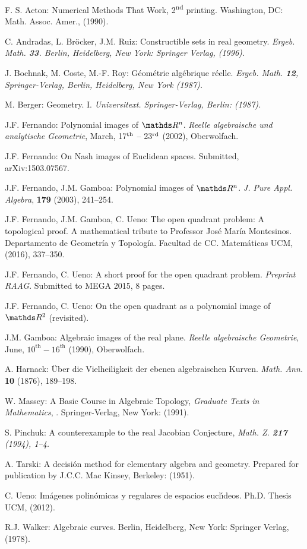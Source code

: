 \documentclass[11pt, a4paper, english, twoside, notitlepage, openright]{report}
\begin{document}
\begin{thebibliography}{ABR}

 F. S. Acton: Numerical Methods That Work, 2\textsuperscript{nd} printing. Washington, DC: Math. Assoc. Amer., (1990). 

 C. Andradas, L. Br\"ocker, J.M. Ruiz: Constructible sets in real geometry. \em Ergeb. Math. \em{\bf 33}. Berlin, Heidelberg, New York: Springer Verlag, (1996).

 J. Bochnak, M. Coste, M.-F. Roy: G\'eom\'etrie alg\'ebrique r\'eelle. \em Ergeb. Math. \em {\bf 12}, Springer-Verlag, Berlin, Heidelberg, New York (1987).

 M. Berger: Geometry. I. \em Universitext\em. Springer-Verlag, Berlin: (1987).

 J.F. Fernando: Polynomial images of $\R^n$. {\em Reelle algebraische und analytische Geometrie}, March, 17$^{\rm th}$ -- 23$^{\rm rd}$ (2002), Oberwolfach.

 J.F. Fernando: On Nash images of Euclidean spaces. Submitted, arXiv:1503.07567.

 J.F. Fernando, J.M. Gamboa: Polynomial images of $\R^n$. {\em J. Pure Appl. Algebra}, {\bf179} (2003), 241--254.

 J.F. Fernando, J.M. Gamboa, C. Ueno: The open quadrant problem:
A topological proof.  A mathematical tribute to Professor Jos\'e Mar\'ia Montesinos. Departamento de Geometr\'ia y Topolog\'ia. Facultad de CC. Matem\'aticas UCM, (2016), 337--350.

 J.F. Fernando, C. Ueno: A short proof for the open quadrant problem. \textit{Preprint RAAG}. Submitted to MEGA 2015, 8 pages.

 J.F. Fernando, C. Ueno: On the open quadrant as a polynomial image of $\R^2$ (revisited).

 J.M. Gamboa: Algebraic images of the real plane. \textit{Reelle algebraische Geometrie}, June,
$10^{\text{th}}-16^{\text{th}}$ (1990), Oberwolfach.

 A. Harnack: \"Uber die Vielheiligkeit der ebenen algebraischen Kurven. {\em Math. Ann.} {\bf10} (1876), 189--198.

 W. Massey: A Basic Course in Algebraic Topology, \emph{Graduate Texts in Mathematics}, \textbf{}.
Springer-Verlag, New York: (1991).

 S. Pinchuk: A counterexample to the real Jacobian Conjecture, \em Math. Z. \em {\bf 217} (1994), 1--4.

 A. Tarski: A decisi\'on method for elementary algebra and geometry. Prepared for publication by J.C.C. Mac Kinsey, Berkeley: (1951).

 C. Ueno: Im\'agenes polin\'omicas y regulares de espacios eucl\'\i deos. Ph.D. Thesis UCM, (2012).

 R.J. Walker: Algebraic curves. Berlin, Heidelberg, New York: Springer Verlag, (1978).

\end{thebibliography}
\end{document}
